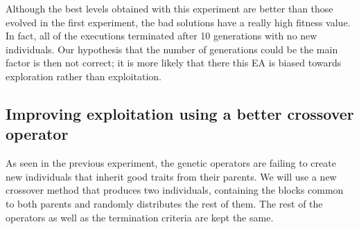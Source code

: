 \documentclass[sigconf]{acmart}
\begin{document}
Although the best levels obtained with this experiment are better than those 
evolved in the first experiment, the bad solutions have a really high fitness 
value. 
In fact, all of the executions terminated after 10 generations with no new individuals.
Our hypothesis that the number of generations could be the main factor
is then not correct; it is more likely that there this EA is biased towards 
exploration rather than exploitation. 
\subsection{Improving exploitation using a better crossover operator}\label{E3}
As seen in the previous experiment, the genetic operators are failing to 
create new individuals that inherit good traits from their parents.
We will use a new crossover method that produces two 
individuals, containing the blocks common to both parents and randomly
distributes the rest of them.
The rest of the operators as 
well as the termination criteria are kept the same. 
\end{document}
